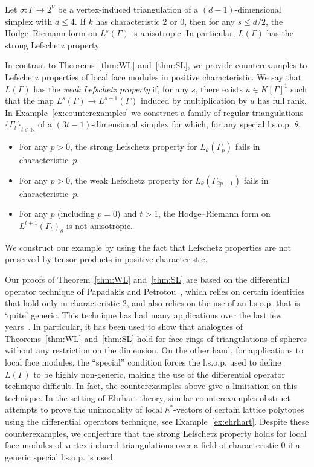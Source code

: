 \begin{theo}\label{thm:SL}
Let $\sigma \colon \Gamma \to 2^V$ be a vertex-induced triangulation of a $(d-1)$-dimensional simplex with $d \le 4$. If $k$ has characteristic $2$ or $0$, then for any $s \le d/2$, the Hodge--Riemann form on $L^s(\Gamma)$ is anisotropic. In particular, $L(\Gamma)$ has the strong Lefschetz property. 

\end{theo}

In contrast to  Theorems~\ref{thm:WL} and~\ref{thm:SL}, 
we provide 
counterexamples to Lefschetz properties of local face modules in positive characteristic. We say that $L(\Gamma)$ has the \emph{weak Lefschetz property} if, for any $s$, there exists $u \in K[\Gamma]^1$ such that the map
$L^s(\Gamma) \to L^{s+1}(\Gamma)$ induced by multiplication by $u$ has full rank. 
In Example~\ref{ex:counterexamples} we construct a family of regular  triangulations $\{\Gamma_{t}\}_{t \in \mathbb{N}}$ of a $(3t-1)$-dimensional simplex for which, for any special l.s.o.p. $\theta$,
\begin{itemize}
		\item For any $p > 0$, the strong Lefschetz property for $L_{\theta}(\Gamma_p)$ fails in characteristic~$p$.
	\item For any $p > 0$, the weak Lefschetz property for $L_{\theta}(\Gamma_{2p - 1})$ fails in characteristic~$p$. 
	\item For any $p$ (including $p = 0$) and $t > 1$, 
	the Hodge--Riemann form on $L^{t + 1}(\Gamma_t)_{\theta}$ is not anisotropic. 
\end{itemize}
We construct our example by
using the fact that Lefschetz properties are not preserved by tensor products in positive characteristic.

Our proofs of Theorem~\ref{thm:WL} and~\ref{thm:SL} are based on the differential operator technique of Papadakis and Petrotou~\cite{PapadakisPetrotoug}, which relies on certain identities that hold only in characteristic $2$, and also relies on the use of an l.s.o.p. that is `quite' generic. This technique has had many applications over the last few years~\cite{APP,APPS,KaruXiao,Oba,LNS,KLS,moment}.
In particular, it has been used to show that analogues of Theorems~\ref{thm:WL} and~\ref{thm:SL} hold for face rings of triangulations of spheres without any restriction on the dimension. 
On the other hand, for applications to local face modules,  the ``special'' condition forces the l.s.o.p. used to define $L(\Gamma)$ to be highly non-generic, making  the use of the differential operator technique difficult. In fact, the counterexamples above 
give a limitation on this technique. 
In the setting of Ehrhart theory, similar counterexamples obstruct attempts to prove the unimodality of 
local $h^*$-vectors
of certain lattice polytopes using the differential operators technique, see Example~\ref{ex:ehrhart}. Despite these counterexamples, we conjecture that the strong Lefschetz property holds for local face modules of vertex-induced triangulations over a field of characteristic $0$ if a generic special l.s.o.p. is used. 

